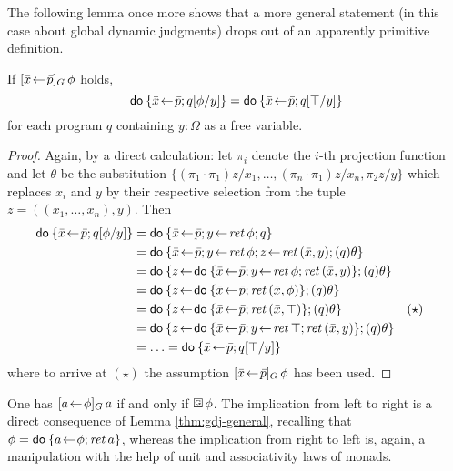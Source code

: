 The following lemma once more shows that a more general statement (in this case
about global dynamic judgments) drops out of an apparently primitive definition.
\begin{lem}
  \label{thm:gdj-general}
  If $[\bar x\!\gets\! \bar p]_G\,\phi$ holds, 
  \[ \mathsf{do}\: \{\bar x\!\gets\! \bar p; q[\phi/y]\} = \mathsf{do}\: \{\bar x\!\gets\! \bar p; q[\top/y]\}
  \]
  for each program $q$ containing $y : \Omega$ as a free variable.
\end{lem}
\begin{proof}
  Again, by a direct calculation: let $\pi_i$ denote the $i$-th projection
  function and let $\theta$ be the substitution $\{(\pi_1\cdot \pi_1)z/x_1, \ldots, (\pi_n\cdot
  \pi_1)z/x_n, \pi_2z/y\}$ which replaces $x_i$ and $y$ by their respective selection
  from the tuple $z= ((x_1,\ldots,x_n), y)$. Then
  \begin{align*}
       \DoStmt{\bar x\leteq \bar p; q[\phi/y]} &= 
       \DoStmt{\bar x\leteq \bar p; y\leteq \ret \phi; q} \\
    &= \DoStmt{\bar x\leteq \bar p; y\leteq \ret \phi; z\leteq \ret (\bar x, y);
      (q)\theta} \\
    &= \DoStmt{z\leteq\DoStmt{\bar x\leteq \bar p; y\leteq \ret \phi; \ret (\bar x,
        y)}; (q)\theta}\\
    &= \DoStmt{z\leteq\DoStmt{\bar x\leteq\bar p; \ret (\bar x, \phi)}; (q)\theta}\\
    &= \DoStmt{z\leteq\DoStmt{\bar x\leteq\bar p; \ret (\bar x, \top)}; (q)\theta} &&(\star)\\
    &= \DoStmt{z\leteq\DoStmt{\bar x\leteq\bar p; y\leteq \ret \top; \ret (\bar x,
        y)}; (q)\theta}\\
    &= \ldots = \DoStmt{\bar x\leteq \bar p; q[\top/y]}
  \end{align*}
  where to arrive at $(\star)$ the assumption  $[\bar x\!\gets\! \bar p]_G\,\phi$ has
  been used.
\end{proof}

\begin{cor}
  \label{thm:gdj-gbox-equiv}
  One has $[a\!\gets\! \phi]_G\,a$ if and only if $\gbox \phi$. The implication from
  left to right is a direct consequence of Lemma \ref{thm:gdj-general},
  recalling that $\phi = \mathsf{do}\: \{a \!\gets\! \phi; \mathit{ret\,} a\}$, whereas the implication from
  right to left is, again, a manipulation with the help of unit and
  associativity laws of monads.
\end{cor}

